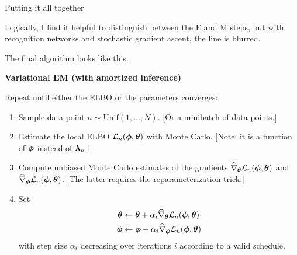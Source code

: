 \documentclass[aspectratio=169]{beamer}
\begin{document}
\begin{frame}[t,allowframebreaks]{Putting it all together}\label{putting-it-all-together}

Logically, I find it helpful to distinguish between the E and M steps,
but with recognition networks and stochastic gradient ascent, the line
is blurred.

The final algorithm looks like this.

\textbf{Variational EM (with amortized inference)}

Repeat until either the ELBO or the parameters converges:

\begin{enumerate}
\def\labelenumi{\arabic{enumi}.}
\item
  Sample data point \(n \sim \mathrm{Unif}(1, \ldots, N)\). {[}Or a
  minibatch of data points.{]}
\item
  Estimate the local ELBO \(\mathcal{L}_n(\boldsymbol{\phi}, \boldsymbol{\theta})\) with Monte Carlo.
  {[}Note: it is a function of \(\boldsymbol{\phi}\) instead of \(\boldsymbol{\lambda}_n\).{]}
\item
  Compute unbiased Monte Carlo estimates of the gradients
  \(\widehat{\nabla}_{\boldsymbol{\theta}} \mathcal{L}_n(\boldsymbol{\phi}, \boldsymbol{\theta})\) and
  \(\widehat{\nabla}_{\boldsymbol{\phi}} \mathcal{L}_n(\boldsymbol{\phi}, \boldsymbol{\theta})\). {[}The latter
  requires the reparameterization trick.{]}
\item
  Set \begin{align*}
   \boldsymbol{\theta} &\leftarrow \boldsymbol{\theta} + \alpha_i \widehat{\nabla}_{\boldsymbol{\theta}} \mathcal{L}_n(\boldsymbol{\phi}, \boldsymbol{\theta}) \\
   \boldsymbol{\phi} &\leftarrow \boldsymbol{\phi} + \alpha_i \widehat{\nabla}_{\boldsymbol{\phi}} \mathcal{L}_n(\boldsymbol{\phi}, \boldsymbol{\theta})
  \end{align*} with step size \(\alpha_i\) decreasing over iterations
  \(i\) according to a valid schedule.
\end{enumerate}
\end{frame}

   
\end{document}
